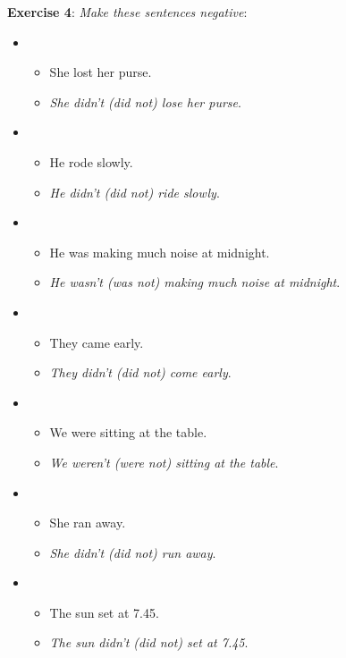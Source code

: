 \textbf{Exercise 4}: \textit{Make these sentences negative}:

\begin{itemize}

\item
\begin{itemize}
\item She lost her purse.
\item \textit{She didn't (did not) lose her purse}.
\end{itemize}

\item
\begin{itemize}
\item He rode slowly.
\item \textit{He didn't (did not) ride slowly}.
\end{itemize}

\item
\begin{itemize}
\item He was making much noise at midnight.
\item \textit{He wasn't (was not) making much noise at midnight}.
\end{itemize}

\item
\begin{itemize}
\item They came early.
\item \textit{They didn't (did not) come early}.
\end{itemize}

\item
\begin{itemize}
\item We were sitting at the table.
\item \textit{We weren't (were not) sitting at the table}.
\end{itemize}

\item
\begin{itemize}
\item She ran away.
\item \textit{She didn't (did not) run away}.
\end{itemize}

\item
\begin{itemize}
\item The sun set at 7.45.
\item \textit{The sun didn't (did not) set at 7.45}.
\end{itemize}


\end{itemize}
